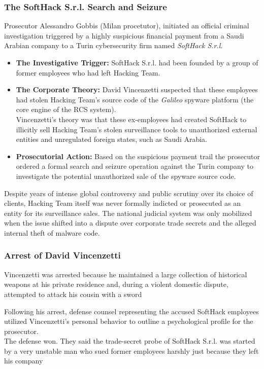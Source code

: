 \subsubsection*{The SoftHack S.r.l. Search and Seizure}
Prosecutor Alessandro Gobbis (Milan procetutor), initiated an official criminal investigation triggered by a highly suspicious financial payment from a Saudi Arabian company to a Turin cybersecurity firm named \textit{SoftHack S.r.l}. 
\begin{itemize}
    \item \textbf{The Investigative Trigger:} SoftHack S.r.l. had been founded by a group of former employees who had left Hacking Team.
    \item \textbf{The Corporate Theory:} David Vincenzetti suspected that these employees had stolen Hacking Team's  source code of the \textit{Galileo} spyware platform (the core engine of the RCS system).\\
    Vincenzetti's theory was that these ex-employees had created SoftHack to illicitly sell Hacking Team's stolen surveillance tools to unauthorized external entities and unregulated foreign states, such as Saudi Arabia.
    \item \textbf{Prosecutorial Action:} Based on the suspicious payment trail the prosecutor ordered a formal search and seizure operation against the Turin company to investigate the potential unauthorized sale of the spyware source code.
\end{itemize}
Despite years of intense global controversy and public scrutiny over its choice of clients, Hacking Team itself was never formally indicted or prosecuted as an entity for its surveillance sales. The national judicial system was only mobilized when the issue shifted into a dispute over corporate trade secrets and the alleged internal theft of malware code.

\subsubsection*{Arrest of David Vincenzetti}
Vincenzetti was arrested because he maintained a large collection of historical weapons at his private residence and, during a violent domestic dispute, attempted to attack his cousin with a sword
\medskip

\noindent
Following his arrest, defense counsel representing the accused SoftHack employees utilized Vincenzetti's personal behavior to outline a psychological profile for the prosecutor.\\
The defense won. They said the trade-secret probe of SoftHack S.r.l. was started by a very unstable man who sued former employees harshly just because they left his company



